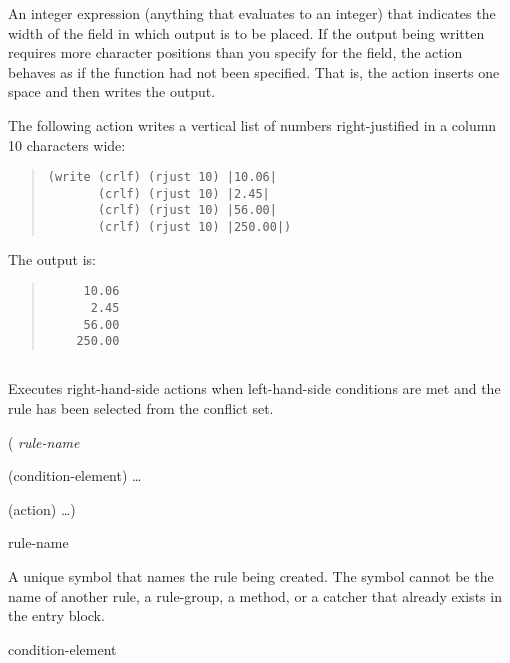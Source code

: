 {{\begin{argument}
  An integer expression (anything that evaluates to an integer) that
  indicates the width of the field in which output is to be placed. If
  the output being written requires more character positions than you
  specify for the field, the  action behaves as if the
   function had not been specified. That is, the action
  inserts one space and then writes the output.
\end{argument}

\Example

The following  action writes a vertical list of numbers
right-justified in a column 10 characters wide:

\begin{quote}
\begin{verbatim}
(write (crlf) (rjust 10) |10.06|
       (crlf) (rjust 10) |2.45|
       (crlf) (rjust 10) |56.00|
       (crlf) (rjust 10) |250.00|)
\end{verbatim}
\end{quote}

The output is:

\begin{quote}
\begin{verbatim}
     10.06
      2.45
     56.00
    250.00
\end{verbatim}
\end{quote}  

\subsection{}

Executes right-hand-side actions when left-hand-side
conditions are met and the rule has been selected from the
conflict set.

\Format

\co( \it{rule-name}

\qquad\co(condition-element\co) \ldots

\quad\co{-->}

\qquad\co(action\co) \ldots\co)

\begin{arguments}
\item[rule-name]

  A unique symbol that names the rule being created. The symbol cannot
  be the name of another rule, a rule-group, a method, or a catcher
  that already exists in the entry block.

\item[condition-element]


\end{arguments}}}
